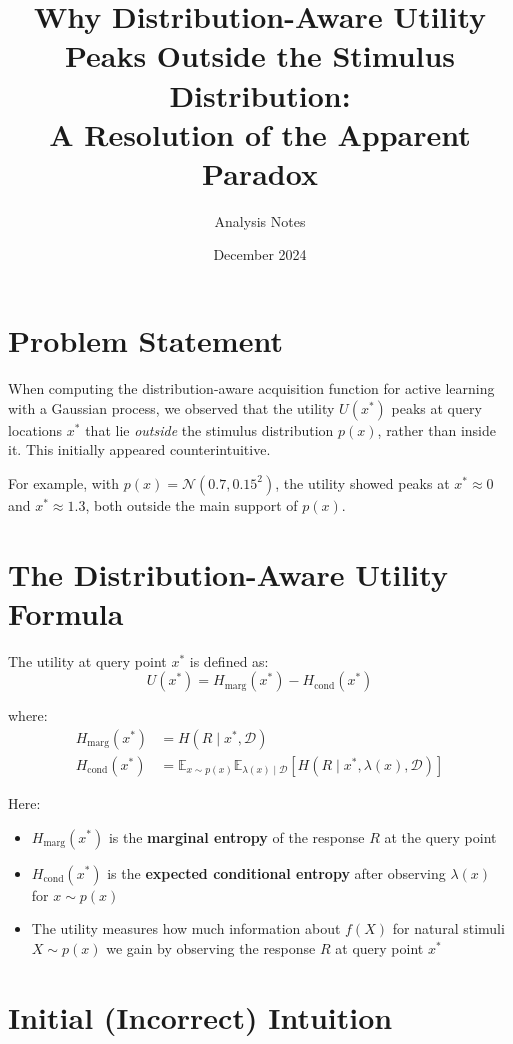 \documentclass[a4paper,11pt]{article}
\title{Why Distribution-Aware Utility Peaks Outside the Stimulus Distribution:\\
A Resolution of the Apparent Paradox}
\author{Analysis Notes}
\date{December 2024}
\newcommand{\Hmarg}{H_{\mathrm{marg}}}
\newcommand{\Hcond}{H_{\mathrm{cond}}}
\newcommand{\E}{\mathbb{E}}
\newcommand{\D}{\mathcal{D}}
\begin{document}
\maketitle

\section{Problem Statement}

When computing the distribution-aware acquisition function for active learning with a Gaussian process, we observed that the utility $U(x^*)$ peaks at query locations $x^*$ that lie \emph{outside} the stimulus distribution $p(x)$, rather than inside it. This initially appeared counterintuitive.

For example, with $p(x) = \mathcal{N}(0.7, 0.15^2)$, the utility showed peaks at $x^* \approx 0$ and $x^* \approx 1.3$, both outside the main support of $p(x)$.

\section{The Distribution-Aware Utility Formula}

The utility at query point $x^*$ is defined as:
\begin{equation}
U(x^*) = \Hmarg(x^*) - \Hcond(x^*)
\end{equation}

where:
\begin{align}
\Hmarg(x^*) &= H(R \mid x^*, \D) \\
\Hcond(x^*) &= \E_{x \sim p(x)} \E_{\lambda(x) \mid \D} \left[ H(R \mid x^*, \lambda(x), \D) \right]
\end{align}

Here:
\begin{itemize}
    \item $\Hmarg(x^*)$ is the \textbf{marginal entropy} of the response $R$ at the query point
    \item $\Hcond(x^*)$ is the \textbf{expected conditional entropy} after observing $\lambda(x)$ for $x \sim p(x)$
    \item The utility measures how much information about $f(X)$ for natural stimuli $X \sim p(x)$ we gain by observing the response $R$ at query point $x^*$
\end{itemize}

\section{Initial (Incorrect) Intuition}
\end{document}
